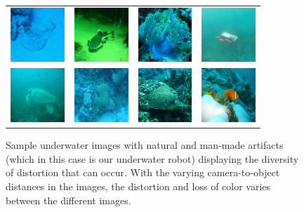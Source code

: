 \documentclass[letterpaper, 10pt, conference]{ieeeconf}
\begin{document}
\begin{figure}
\centering
\begin{tabular}{p{1.7cm} p{1.7cm} p{1.7cm} p{1.7cm}}
   
   \includegraphics[width=0.8in]{n01496331_7428_f1} &
   \includegraphics[width=0.8in]{n01496331_16340_f1} &
   \includegraphics[width=0.8in]{n01914609_5148_f1} &
   \includegraphics[width=0.8in]{robot_f1} \\
   \includegraphics[width=0.8in]{n01664065_30279_f1} &
   \includegraphics[width=0.8in]{n01917289_5711_f1} &
   \includegraphics[width=0.8in]{n01917289_4087_f1} &
   \includegraphics[width=0.8in]{n02607072_10395_f1} \\

\end{tabular}
\label{fig:samples}
\caption{Sample underwater images with natural and man-made artifacts (which in this case is our underwater robot) displaying the 
diversity of distortion that can occur. With the varying camera-to-object distances in the images, the distortion and loss of 
color varies between the different images.}
\end{figure}
\end{document}
